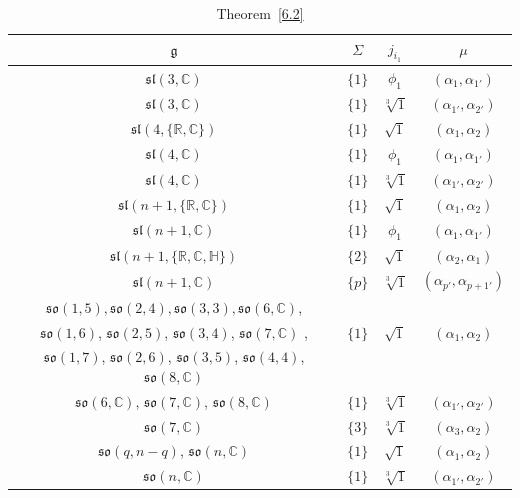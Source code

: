 \documentclass[10pt,a4paper]{amsart}
\newcommand{\fg}{\mathfrak g}
\numberwithin{equation}{section}
\begin{document}
\begin{table}[th!]\caption{Theorem~\ref{6.2}}\label{ahs1}\centering \vspace{1mm}
\begin{tabular}{|c|c|c|c|}
\hline
$\fg$ & $\Sigma$ & $j_{i_1}$ & $\mu$\\
\hline
\hline
$\mathfrak{sl}(3,\mathbb{C})$ & $\{1\}$&$\phi_1$ & $(\alpha_1,\alpha_{1'})$ \\
\hline
$\mathfrak{sl}(3,\mathbb{C})$ & $\{1\}$&$\sqrt[3]{1}$& $(\alpha_{1'},\alpha_{2'})$ \\
\hline
$\mathfrak{sl}(4,\{\mathbb{R,C}\})$ & $\{1\}$&$\sqrt{1}$& $(\alpha_1,\alpha_2)$ \\
\hline
$\mathfrak{sl}(4,\mathbb{C})$ & $\{1\}$&$\phi_1$ & $(\alpha_1,\alpha_{1'})$ \\
\hline
$\mathfrak{sl}(4,\mathbb{C})$ & $\{1\}$&$\sqrt[3]{1}$& $(\alpha_{1'},\alpha_{2'})$ \\
\hline
$\mathfrak{sl}(n+1,\{\mathbb{R,C}\})$ & $\{1\}$&$\sqrt{1}$& $(\alpha_1,\alpha_2)$ \\
\hline
$\mathfrak{sl}(n+1,\mathbb{C})$ & $\{1\}$&$\phi_1$ & $(\alpha_1,\alpha_{1'})$ \\
\hline
$\mathfrak{sl}(n+1,\{\mathbb{R, C, H}\})$ &$\{2\}$ &$\sqrt{1}$& $(\alpha_2,\alpha_1)$ \\
\hline
$\mathfrak{sl}(n+1,\mathbb{C})$ & $\{p\}$&$\sqrt[3]{1}$& $(\alpha_{p'},\alpha_{p+1'})$ \\
\hline
$\mathfrak{so}(1,5),\mathfrak{so}(2,4),\mathfrak{so}(3,3),\mathfrak{so}(6,\mathbb{C})$, & & &\\
$\mathfrak{so}(1,6)$, $\mathfrak{so}(2,5)$, $\mathfrak{so}(3,4)$, $\mathfrak{so}(7,\mathbb{C})$ , &$\{1\}$ &$\sqrt{1}$& $(\alpha_1,\alpha_2)$ \\
$\mathfrak{so}(1,7)$, $\mathfrak{so}(2,6)$, $\mathfrak{so}(3,5)$, $\mathfrak{so}(4,4)$, $\mathfrak{so}(8,\mathbb{C})$& & & \\
\hline
$\mathfrak{so}(6,\mathbb{C})$, $\mathfrak{so}(7,\mathbb{C})$, $\mathfrak{so}(8,\mathbb{C})$ & $\{1\}$&$\sqrt[3]{1}$& $(\alpha_{1'},\alpha_{2'})$ \\
\hline
$\mathfrak{so}(7,\mathbb{C})$ & $\{3\}$&$\sqrt[3]{1}$ &$(\alpha_3,\alpha_2)$\\
\hline
$\mathfrak{so}(q,n-q)$, $\mathfrak{so}(n,\mathbb{C})$ & $\{1\}$&$\sqrt{1}$ & $(\alpha_1,\alpha_2)$ \\
\hline
$\mathfrak{so}(n,\mathbb{C})$ & $\{1\}$&$\sqrt[3]{1}$& $(\alpha_{1'},\alpha_{2'})$ \\
\hline

\end{tabular}
\end{table}
\end{document}
